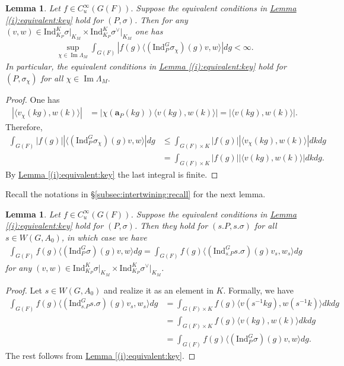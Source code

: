 \documentclass[10pt]{amsart}
\newtheorem{lemma}[theorem]{Lemma}
\theoremstyle{definition}
\numberwithin{equation}{section}
\numberwithin{equation}{subsection}
\newcommand{\Ind}{\mathrm{Ind}}
\renewcommand{\Im}{\mathop{\mathrm{Im}}}
\begin{document}
\begin{lemma} \label{lem:exchange}
Let $f\in C^\infty_u(G(F)).$ Suppose the equivalent conditions in \hyperref[(i):equivalent:key]{Lemma \ref{(i):equivalent:key}} hold for $(P,\sigma)$. Then for any $(v,w)\in \Ind_{K_P }^K\sigma\vert_{K_M }\times\Ind_{K_P }^K\sigma^\vee\vert_{K_M }$ one has
\begin{align*}
    \sup_{\chi\in\Im\Lambda_M}\int_{G(F)}|f(g)\langle (\Ind_P^G\sigma_{\chi})(g)v,w\rangle| dg<\infty.
\end{align*}
In particular, the equivalent conditions in \hyperref[(i):equivalent:key]{Lemma \ref{(i):equivalent:key}} hold for $(P,\sigma_\chi)$ for all $\chi\in \Im \Lambda_M.$
\end{lemma}
\begin{proof}
 One has
\begin{align*}
    \left|\langle v_{\chi}(kg),w(k)\rangle \right| &= \left|\chi(\textbf{a}_P(kg))\langle v(kg),w(k)\rangle \right|= \left|\langle v(kg),w(k)\rangle \right|.
\end{align*}
Therefore,
\begin{align*}
    \int_{G(F)} \left|f(g)\right|\left|\langle (\Ind_P^G\sigma_{\chi})(g)v,w\rangle\right| dg &\leq  \int_{G(F)\times K} |f(g)| \left|\langle v_{\chi}(kg),w(k)\rangle \right|dk dg\\
    &=\int_{G(F)\times K} |f(g)| \left|\langle v(kg),w(k)\rangle \right|dk dg.
\end{align*}
By \hyperref[(i):equivalent:key]{Lemma \ref{(i):equivalent:key}} the last integral is finite.
\end{proof}

Recall the notations in \S\ref{subsec:intertwining:recall} for the next lemma.
\begin{lemma}\label{intertwine:W}
Let $f\in C^\infty_{u}(G(F))$. Suppose the equivalent conditions in \hyperref[(i):equivalent:key]{Lemma \ref{(i):equivalent:key}} hold for $(P,\sigma)$. Then they hold for $(s.P,s.\sigma)$ for all $s\in W(G,A_0)$, in which case we have
\begin{align*}
     \int_{G(F)} f(g)\langle (\mathrm{Ind}_P^G\sigma )(g)v,w\rangle dg=\int_{G(F)} f(g)\langle (\Ind_{s.P}^Gs.\sigma)(g)v_s,w_{s}\rangle dg
\end{align*}
for any $(v,w)\in \Ind_{K_P }^K\sigma\vert_{K_M }\times\Ind_{K_P }^K\sigma^\vee\vert_{K_M }$.
\end{lemma}

\begin{proof} Let $s\in W(G,A_0)$ and realize it as an element in $K$.
    Formally, we have
    \begin{align*}
        \int_{G(F)} f(g)\langle (\Ind_{s.P}^Gs.\sigma)(g)v_s,w_{s}\rangle dg&=\int_{G(F)\times K} f(g)\langle v(s^{-1}kg),w(s^{-1}k)\rangle dkdg\\
        &=\int_{G(F)\times K} f(g)\langle v(kg),w(k)\rangle dkdg\\
        &=\int_{G(F)} f(g)\langle (\mathrm{Ind}_P^G\sigma )(g)v,w\rangle dg.
    \end{align*}
     The rest follows from \hyperref[(i):equivalent:key]{Lemma \ref{(i):equivalent:key}}.
\end{proof}
\end{document}
